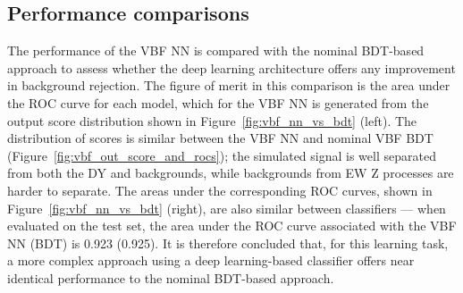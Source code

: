 \subsection{Performance comparisons}

The performance of the VBF NN is compared with the nominal BDT-based approach to assess whether the deep learning architecture offers any improvement in background rejection. The figure of merit in this comparison is the area under the ROC curve for each model, which for the VBF NN is generated from the output score distribution shown in Figure~\ref{fig:vbf_nn_vs_bdt} (left). The distribution of scores is similar between the VBF NN and nominal VBF BDT (Figure~\ref{fig:vbf_out_score_and_rocs}); the simulated signal is well separated from both the DY and \ttbar backgrounds, while backgrounds from EW $\mathrm{Z}$ processes are harder to separate. The areas under the corresponding ROC curves, shown in Figure~\ref{fig:vbf_nn_vs_bdt} (right), are also similar between classifiers --- when evaluated on the test set, the area under the ROC curve associated with the VBF NN (BDT) is 0.923 (0.925). It is therefore concluded that, for this learning task, a more complex approach using a deep learning-based classifier offers near identical performance to the nominal BDT-based approach. %

